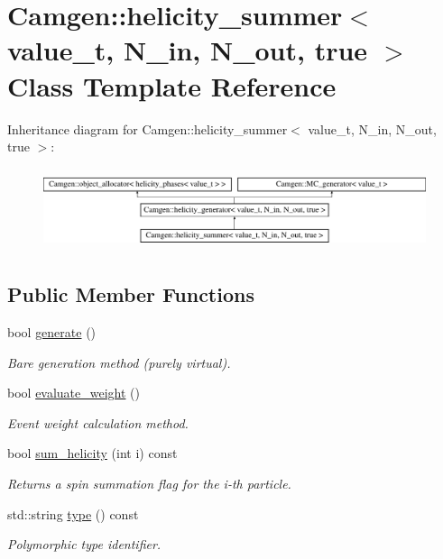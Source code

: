 \hypertarget{a00281}{}\section{Camgen\+:\+:helicity\+\_\+summer$<$ value\+\_\+t, N\+\_\+in, N\+\_\+out, true $>$ Class Template Reference}
\label{a00281}
Inheritance diagram for Camgen\+:\+:helicity\+\_\+summer$<$ value\+\_\+t, N\+\_\+in, N\+\_\+out, true $>$\+:\begin{figure}[H]
\begin{center}
\leavevmode
\includegraphics[height=2.420749cm]{a00281}
\end{center}
\end{figure}
\subsection*{Public Member Functions}
\begin{DoxyCompactItemize}
\item 
bool \hyperlink{a00281_a7cbb856889e174753808bfd9a57424d5}{generate} ()
\begin{DoxyCompactList}\small\item\em \textquotesingle{}Bare generation\textquotesingle{} method (purely virtual). \end{DoxyCompactList}\item 
\hypertarget{a00281_affd795eb3e090abbe1b575de0f2bd6ca}{}bool \hyperlink{a00281_affd795eb3e090abbe1b575de0f2bd6ca}{evaluate\+\_\+weight} ()\label{a00281_affd795eb3e090abbe1b575de0f2bd6ca}

\begin{DoxyCompactList}\small\item\em Event weight calculation method. \end{DoxyCompactList}\item 
bool \hyperlink{a00281_a4575189a6a7b4c223b76753639dec319}{sum\+\_\+helicity} (int i) const 
\begin{DoxyCompactList}\small\item\em Returns a spin summation flag for the i-\/th particle. \end{DoxyCompactList}\item 
\hypertarget{a00281_a96241b3c89d99880657283ccab987147}{}std\+::string \hyperlink{a00281_a96241b3c89d99880657283ccab987147}{type} () const \label{a00281_a96241b3c89d99880657283ccab987147}

\begin{DoxyCompactList}\small\item\em Polymorphic type identifier. \end{DoxyCompactList}\end{DoxyCompactItemize}
